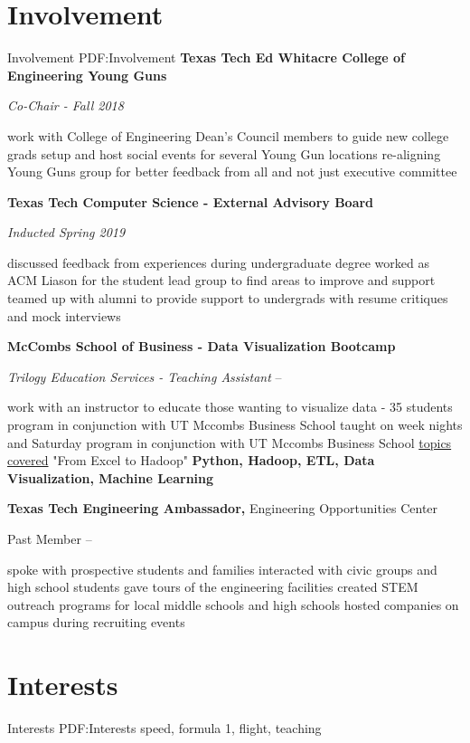 \documentclass[a4paper,10pt,oneside]{article}
\begin{document}
\begin{body}
\section
{Involvement}
{Involvement}
{PDF:Involvement}
{\textbf{Texas Tech Ed Whitacre College of Engineering Young Guns}}
\par
\Item
\textit{Co-Chair - Fall 2018}
\hfill
\begin{detail}
\SmallEntryGap
\BulletItem
work with College of Engineering Dean's Council members to guide new college grads
\BulletItem
setup and host social events for several Young Gun locations
\BulletItem
re-aligning Young Guns group for better feedback from all and not just executive committee
\end{detail}
\SmallEntryGap
{\textbf{Texas Tech Computer Science - External Advisory Board}}
\par
\Item
\textit{Inducted Spring 2019}
\hfill
\begin{detail}
\SmallEntryGap
\BulletItem
discussed feedback from experiences during undergraduate degree
\BulletItem
worked as ACM Liason for the student lead group to find areas to improve and support
\BulletItem
teamed up with alumni to provide support to undergrads with resume critiques and mock interviews
\end{detail}
\SmallEntryGap
{\textbf{McCombs School of Business - Data Visualization Bootcamp}}
\par
\Item
\textit{Trilogy Education Services  - Teaching Assistant}
\hfill
{} --
\begin{detail}
\SmallEntryGap
\BulletItem
work with an instructor to educate those wanting to visualize data - 35 students
\BulletItem
program in conjunction with UT Mccombs Business School taught on week nights and Saturday
\BulletItem
program in conjunction with UT Mccombs Business School
\BulletItem
\href{https://techbootcamps.utexas.edu/data/}{topics covered} "From Excel to Hadoop"
\Item
\textbf{Python, Hadoop, ETL, Data Visualization, Machine Learning}
\end{detail}
\SmallEntryGap
{\textbf{Texas Tech Engineering Ambassador,}  Engineering Opportunities Center}
\par
\Item
Past Member
\hfill
{} --
\begin{detail}
\BulletItem
spoke with prospective students and families 
\BulletItem
interacted with civic groups and high school students
\BulletItem
gave tours of the engineering facilities
\BulletItem
created STEM outreach programs for local middle schools and high schools
\BulletItem
hosted companies on campus during recruiting events
\end{detail}
\SmallEntryGap







\section
{Interests}
{Interests}
{PDF:Interests}
speed, formula 1, flight, teaching
\end{body}
\end{document}
